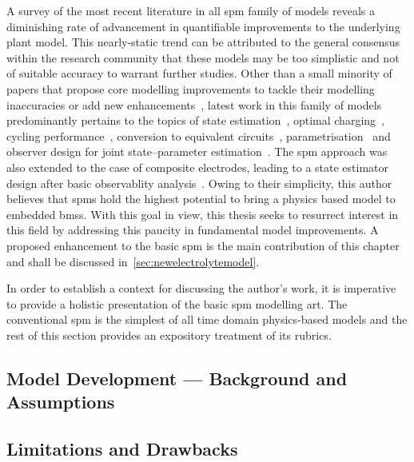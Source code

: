 A  survey of  the  most recent  literature  in all  \gls{spm}  family of  models
reveals a  diminishing rate of  advancement in quantifiable improvements  to the
underlying  plant model.  This  nearly-static  trend can  be  attributed to  the
general consensus  within the research  community that  these models may  be too
simplistic and not  of suitable accuracy to warrant further  studies. Other than
a  small  minority  of  papers  that  propose  core  modelling  improvements  to
tackle  their modelling  inaccuracies  or  add new  enhancements~\cite{Li2017a},
latest  work in  this  family of  models predominantly  pertains  to the  topics
of    state   estimation~\cite{Chaochun2018,Lin2017,Tran2017,Moura2017,Zou2016},
optimal    charging~\cite{Perez2015},    cycling    performance~\cite{Maia2017},
conversion           to            equivalent           circuits~\cite{Li2017b},
parametrisation~\cite{Li2018,Rajabloo2017,Bizeray2017}  and observer  design for
joint  state--parameter estimation~\cite{Ascencio2016}.  The \gls{spm}  approach
was  also extended  to the  case  of composite  electrodes, leading  to a  state
estimator design  after basic observablity  analysis~\cite{Bartlett2015b}. Owing
to  their simplicity,  this author  believes  that \gls{spm}s  hold the  highest
potential to bring a physics based  model to embedded \gls{bms}s. With this goal
in view,  this thesis seeks  to resurrect interest  in this field  by addressing
this paucity  in fundamental model  improvements. A proposed enhancement  to the
basic \gls{spm} is the main contribution  of this chapter and shall be discussed
in~\cref{sec:newelectrolytemodel}.


In  order  to establish  a  context  for discussing  the  author's  work, it  is
imperative to provide  a holistic presentation of the  basic \gls{spm} modelling
art. The conventional \gls{spm} is the simplest of all time domain physics-based
models and  the rest  of this  section provides an  expository treatment  of its
rubrics.



\subsection{Model Development --- Background and Assumptions}

\subsection{Limitations and Drawbacks}\label{subsec:basicspmlimitations}

